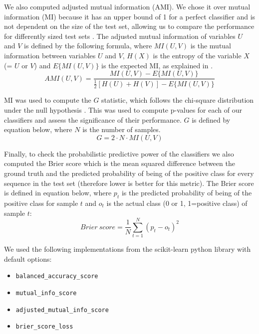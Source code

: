 \documentclass[
  11,
]{scrbook}
\providecommand{\tightlist}{%
  \setlength{\itemsep}{0pt}\setlength{\parskip}{0pt}}
\begin{document}
We also computed adjusted mutual information (AMI). We chose it over
mutual information (MI) because it has an upper bound of 1 for a perfect
classifier and is not dependent on the size of the test set, allowing us
to compare the performance for differently sized test sets
\autocite{vinhInformationTheoreticMeasures2010}. The adjusted mutual information
of variables \(U\) and \(V\) is defined by the following formula, where
\(MI(U,V)\) is the mutual information between variables \(U\) and \(V\),
\(H(X)\) is the entropy of the variable \(X\) (= \(U\) or \(V\)) and
\(E\{MI(U,V)\}\) is the expected MI, as explained in
\autocite{vinhNovelApproachAutomatic2009}.\\
\[
AMI(U,V) = \frac{
      MI(U,V) - E\{MI(U,V)\} 
  }{
      \frac{1}{2}[H(U) + H(V)] - E\{MI(U,V)\}
  }
\]

MI was used to compute the \(G\) statistic, which follows the chi-square
distribution under the null hypothesis
\autocite{harremoesMutualInformationContingency2014}. This was used to compute
p-values for each of our classifiers and assess the significance of
their performance. \(G\) is defined by equation below, where \(N\) is the
number of samples.\\
\[G = 2\cdot N \cdot MI(U,V)\]

Finally, to check the probabilistic predictive power of the classifiers
we also computed the Brier score which is the mean squared difference
between the ground truth and the predicted probability of being of the
positive class for every sequence in the test set (therefore lower is
better for this metric). The Brier score is defined in equation below,
where \(p_t\) is the predicted probability of being of the positive class
for sample \(t\) and \(o_t\) is the actual class (0 or 1, 1=positive class)
of sample \(t\):\\
\[Brier~score=\frac{1}{N}\sum_{t=1}^N(p_t-o_t)^2\]

We used the following implementations from the scikit-learn python
library \autocite{pedregosaScikitlearnMachineLearning2011} with default options:

\begin{itemize}
\tightlist
\item
  \texttt{balanced\_accuracy\_score}
\item
  \texttt{mutual\_info\_score}
\item
  \texttt{adjusted\_mutual\_info\_score}
\item
  \texttt{brier\_score\_loss}
\end{itemize}
\end{document}
